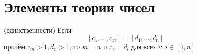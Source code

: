 \section{Элементы теории чисел}
\noindent
\The (единственности) Если
\[
[c_1,\dots,c_m]=[d_1,\dots,d_n]
\]
причём $c_m>1, d_n>1$, то $m=n$ и $c_c=d_i$ для всех $i:~i\in[1,n]$ 